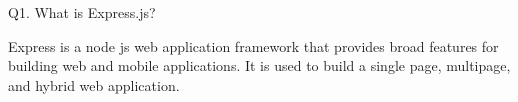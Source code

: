 Q1. What is Express.js?

  Express is a node js web application framework that provides broad 
features for building web and mobile applications. It is used to 
build a single page, multipage, and hybrid web application.